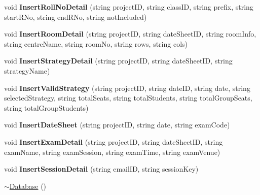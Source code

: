 \begin{DoxyCompactItemize}
\item 
\hypertarget{classDatabase_a91882082bd5309ba21d7250f0877ab39}{void {\bfseries Insert\-Roll\-No\-Detail} (string project\-I\-D, string class\-I\-D, string prefix, string start\-R\-No, string end\-R\-No, string not\-Included)}\label{classDatabase_a91882082bd5309ba21d7250f0877ab39}

\item 
\hypertarget{classDatabase_a27092ca18e5f95b2808e54ad89c6ca35}{void {\bfseries Insert\-Room\-Detail} (string project\-I\-D, string date\-Sheet\-I\-D, string room\-Info, string centre\-Name, string room\-No, string rows, string cols)}\label{classDatabase_a27092ca18e5f95b2808e54ad89c6ca35}

\item 
\hypertarget{classDatabase_a8a13b478ab9c5c9fabc07b9513530bc0}{void {\bfseries Insert\-Strategy\-Detail} (string project\-I\-D, string date\-Sheet\-I\-D, string strategy\-Name)}\label{classDatabase_a8a13b478ab9c5c9fabc07b9513530bc0}

\item 
\hypertarget{classDatabase_ae20d8dbfb3d8755cd4cf508a503fd9b6}{void {\bfseries Insert\-Valid\-Strategy} (string project\-I\-D, string date\-I\-D, string date, string selected\-Strategy, string total\-Seats, string total\-Students, string total\-Group\-Seats, string total\-Group\-Students)}\label{classDatabase_ae20d8dbfb3d8755cd4cf508a503fd9b6}

\item 
\hypertarget{classDatabase_ab410079853d849a9104be0689abee878}{void {\bfseries Insert\-Date\-Sheet} (string project\-I\-D, string date, string exam\-Code)}\label{classDatabase_ab410079853d849a9104be0689abee878}

\item 
\hypertarget{classDatabase_a1c68383f46e3c3026ff53aeb4e5f76ab}{void {\bfseries Insert\-Exam\-Detail} (string project\-I\-D, string date\-Sheet\-I\-D, string exam\-Name, string exam\-Session, string exam\-Time, string exam\-Venue)}\label{classDatabase_a1c68383f46e3c3026ff53aeb4e5f76ab}

\item 
\hypertarget{classDatabase_a61963a0b66aca78ffa950b22ee959c47}{void {\bfseries Insert\-Session\-Detail} (string email\-I\-D, string session\-Key)}\label{classDatabase_a61963a0b66aca78ffa950b22ee959c47}

\item 
\hyperlink{classDatabase_a84d399a2ad58d69daab9b05330e1316d}{$\sim$\-Database} ()
\end{DoxyCompactItemize}
